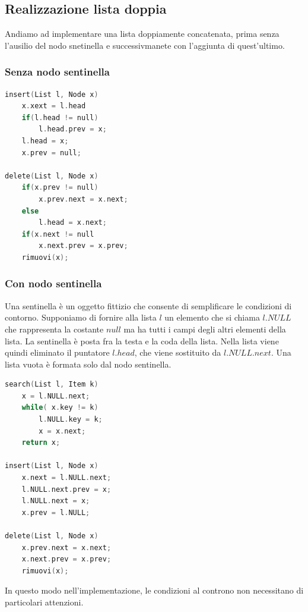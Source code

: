\documentclass[italian]{article}
\begin{document}
\subsection{Realizzazione lista doppia}
Andiamo ad implementare una lista doppiamente concatenata, prima senza l'ausilio del nodo snetinella e successivmanete con l'aggiunta di quest'ultimo.
\subsubsection{Senza nodo sentinella}
\begin{lstlisting}[language=c,mathescape=true]
insert(List l, Node x)
	x.xext = l.head
	if(l.head != null)
		l.head.prev = x;
	l.head = x;
	x.prev = null;

delete(List l, Node x)
	if(x.prev != null)
		x.prev.next = x.next;
	else
		l.head = x.next;
	if(x.next != null
		x.next.prev = x.prev;
	rimuovi(x);
\end{lstlisting}
\subsubsection{Con nodo sentinella}
Una sentinella è un oggetto fittizio che consente di semplificare le condizioni di contorno. Supponiamo di fornire alla lista $l$ un elemento che si chiama $l.NULL$ che rappresenta la costante $null$ ma ha tutti i campi degli altri elementi della lista. La sentinella è posta fra la testa e la coda della lista. Nella lista viene quindi eliminato il puntatore $l.head$, che viene sostituito da $l.NULL.next$. Una lista vuota è formata solo dal nodo sentinella.
\begin{lstlisting}[language=c,mathescape=true]
search(List l, Item k)
	x = l.NULL.next;
	while( x.key != k)
		l.NULL.key = k;
		x = x.next;
	return x;

insert(List l, Node x)
	x.next = l.NULL.next;
	l.NULL.next.prev = x;
	l.NULL.next = x;
	x.prev = l.NULL;

delete(List l, Node x)
	x.prev.next = x.next;
	x.next.prev = x.prev;
	rimuovi(x);
\end{lstlisting}
In questo modo nell'implementazione, le condizioni al controno non necessitano di particolari attenzioni.
\pagebreak
\end{document}

